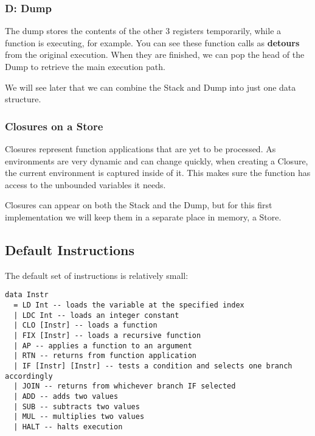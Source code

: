 \subsubsection{D: Dump}
The dump stores the contents of the other 3 registers temporarily, while a function is executing, for example.
You can see these function calls as \textbf{detours} from the original execution. When they are finished, 
we can pop the head of the Dump to retrieve the main execution path.

We will see later that we can combine the Stack and Dump into just one data structure.
\subsubsection{Closures on a Store}
Closures represent function applications that are yet to be processed. As environments are very dynamic and can change quickly, when creating a Closure, the current environment
is captured inside of it. This makes sure the function has access to the unbounded variables it needs.

Closures can appear on both the Stack and the Dump, but for this first implementation we will keep them in a separate place in memory,
a Store.

\subsection{Default Instructions}
The default set of instructions is relatively small:
\begin{lstlisting}
data Instr
  = LD Int -- loads the variable at the specified index 
  | LDC Int -- loads an integer constant
  | CLO [Instr] -- loads a function
  | FIX [Instr] -- loads a recursive function
  | AP -- applies a function to an argument
  | RTN -- returns from function application
  | IF [Instr] [Instr] -- tests a condition and selects one branch accordingly
  | JOIN -- returns from whichever branch IF selected
  | ADD -- adds two values
  | SUB -- subtracts two values
  | MUL -- multiplies two values
  | HALT -- halts execution
\end{lstlisting}

